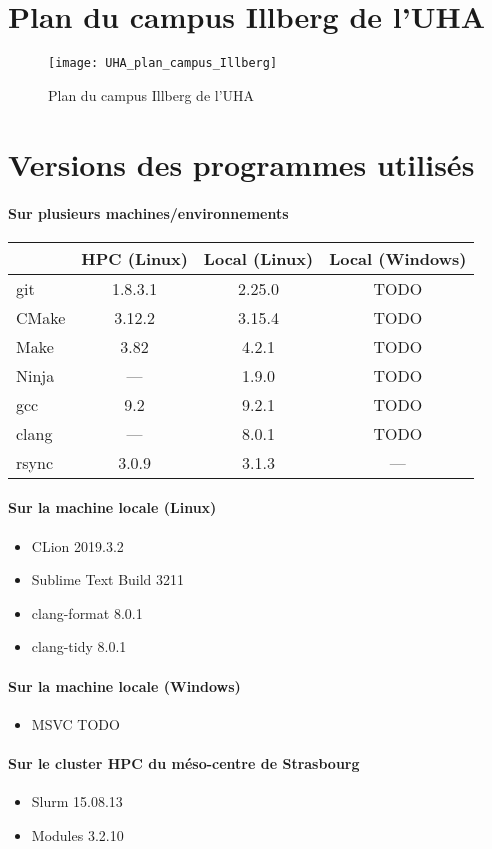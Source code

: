 \documentclass[a4paper,11pt,twoside,french,report]{../common/simplem}
\begin{document}
			\paragraph*{}
				
				\hfill\\
		\newpage\section{Plan du campus Illberg de l'\acrshort{UHA}}\label{sec:uha_illberg_map}
			\begin{figure}[H]
				\centering%
				\texttt{[image: UHA\_plan\_campus\_Illberg]}%
				\caption{Plan du campus Illberg de l'\acrshort{UHA}~\cite{UHA_Plan_acces}}%
				\label{fig:UHA_plan_campus_Illberg}%
			\end{figure}
		\newpage\section{Versions des programmes utilisés}\label{sec:programs_versions}
			\paragraph*{Sur plusieurs machines/environnements}
				\begin{center}
					\begin{tabular}{lccc}
						& HPC (Linux) & Local (Linux) & Local (Windows)\\
						\midrule
						git & 1.8.3.1 & 2.25.0 & TODO\\
						CMake & 3.12.2 & 3.15.4 & TODO\\
						Make & 3.82 & 4.2.1 & TODO\\
						Ninja & --- & 1.9.0 & TODO\\
						gcc & 9.2 & 9.2.1 & TODO\\
						clang & --- & 8.0.1 & TODO\\
						rsync & 3.0.9 & 3.1.3 & ---\\
					\end{tabular}
				\end{center}
			\paragraph*{Sur la machine locale (Linux)}
				\begin{itemize}
					\item CLion 2019.3.2
					\item Sublime Text Build 3211
					\item clang-format 8.0.1
					\item clang-tidy 8.0.1
				\end{itemize}
			\paragraph*{Sur la machine locale (Windows)}
				\begin{itemize}
					\item MSVC TODO
				\end{itemize}
			\paragraph*{Sur le cluster \gls{HPC} du méso-centre de Strasbourg}
				\begin{itemize}
					\item Slurm 15.08.13
					\item Modules 3.2.10
				\end{itemize}
	\makeutbmbackcover{}
\end{document}

